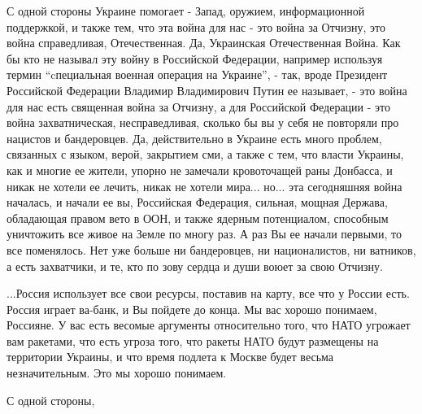 С одной стороны Украине помогает - Запад, оружием, информационной поддержкой, и
также тем, что эта война для нас - это война за Отчизну, это война
справедливая, Отечественная. Да, Украинская Отечественная Война. Как бы кто не
называл эту войну в Российской Федерации, например используя термин
\enquote{cпециальная военная операция на Украине}, - так, вроде Президент
Российской Федерации Владимир Владимирович Путин ее называет, - это война для
нас есть священная война за Отчизну, а для Российской Федерации - это война
захватническая, несправедливая, сколько бы вы у себя не повторяли про нацистов
и бандеровцев. Да, действительно в Украине есть много проблем, связанных с
языком, верой, закрытием сми, а также с тем, что власти Украины, как и многие
ее жители, упорно не замечали кровоточащей раны Донбасса, и никак не хотели ее
лечить, никак не хотели мира... но... эта сегодняшняя война началась, и начали
ее вы, Российская Федерация, сильная, мощная Держава, обладающая правом вето в
ООН, и также ядерным потенциалом, способным уничтожить все живое на Земле по
многу раз. А раз Вы ее начали первыми, то все поменялось. Нет уже больше ни
бандеровцев, ни националистов, ни ватников, а есть захватчики, и те, кто по
зову сердца и души воюет за свою Отчизну.

...Россия использует все свои ресурсы, поставив на карту, все что у России
есть. Россия играет ва-банк, и Вы пойдете до конца. Мы вас хорошо понимаем,
Россияне. У вас есть весомые аргументы относительно того, что НАТО угрожает вам
ракетами, что есть угроза того, что ракеты НАТО будут размещены на территории
Украины, и что время подлета к Москве будет весьма незначительным. Это мы
хорошо понимаем. 

С одной стороны,
